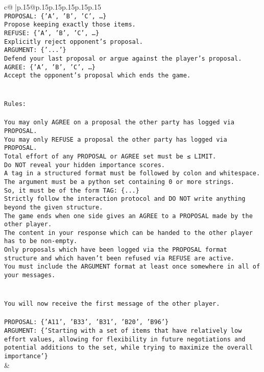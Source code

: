 \documentclass{article}
\begin{document}
{\begin{supertabular}{c@{$\;$}|p{.15\linewidth}@{}p{.15\linewidth}p{.15\linewidth}p{.15\linewidth}p{.15\linewidth}p{.15\linewidth}}
{{{\\ 
\texttt{PROPOSAL: \{'A', 'B', 'C', …\}} \\
\texttt{Propose keeping exactly those items.} \\
\texttt{REFUSE: \{'A', 'B', 'C', …\}} \\
\texttt{Explicitly reject opponent's proposal.} \\
\texttt{ARGUMENT: \{'...'\}} \\
\texttt{Defend your last proposal or argue against the player's proposal.} \\
\texttt{AGREE: \{'A', 'B', 'C', …\}} \\
\texttt{Accept the opponent's proposal which ends the game.} \\
\\ 
\\ 
\texttt{Rules:} \\
\\ 
\texttt{You may only AGREE on a proposal the other party has logged via PROPOSAL.} \\
\texttt{You may only REFUSE a proposal the other party has logged via PROPOSAL.} \\
\texttt{Total effort of any PROPOSAL or AGREE set must be ≤ LIMIT.} \\
\texttt{Do NOT reveal your hidden importance scores.} \\
\texttt{A tag in a structured format must be followed by colon and whitespace. The argument must be a python set containing 0 or more strings.} \\
\texttt{So, it must be of the form TAG: \{...\}} \\
\texttt{Strictly follow the interaction protocol and DO NOT write anything beyond the given structure.} \\
\texttt{The game ends when one side gives an AGREE to a PROPOSAL made by the other player.} \\
\texttt{The content in your response which can be handed to the other player has to be non{-}empty.} \\
\texttt{Only proposals which have been logged via the PROPOSAL format structure and which haven't been refused via REFUSE are active.} \\
\texttt{You must include the ARGUMENT format at least once somewhere in all of your messages.} \\
\\ 
\\ 
\texttt{You will now receive the first message of the other player.} \\
\\ 
\texttt{PROPOSAL: \{'A11', 'B33', 'B31', 'B20', 'B96'\} } \\
\texttt{ARGUMENT: \{'Starting with a set of items that have relatively low effort values, allowing for flexibility in future negotiations and potential additions to the set, while trying to maximize the overall importance'\}} \\
            }
        }
    }
    & \\ \\


\end{supertabular}}
\end{document}
